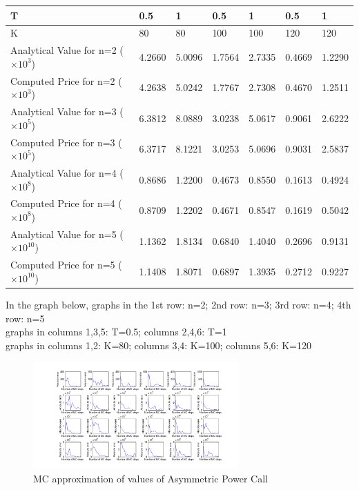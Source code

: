 \documentclass[a4paper]{article}
\begin{document}
\begin{enumerate}
\begin{enumerate}
\begin{table}[ht]
	\centering
    \begin{tabular}{|l|l|l|l|l|l|l|}
    \hline
    T                                          & 0.5    & 1      & 0.5    & 1      & 0.5    & 1      \\ \hline
    K                                          & 80     & 80     & 100    & 100    & 120    & 120    \\ \hline
    Analytical Value for n=2 ($\times10^3$)    & 4.2660 & 5.0096 & 1.7564 & 2.7335 & 0.4669 & 1.2290 \\ \hline
    Computed Price for n=2 ($\times10^3$)      & 4.2638 & 5.0242 & 1.7767 & 2.7308 & 0.4670 & 1.2511 \\ \hline
    Analytical Value for n=3 ($\times10^5$)    & 6.3812 & 8.0889 & 3.0238 & 5.0617 & 0.9061 & 2.6222 \\ \hline
    Computed Price for n=3 ($\times10^5$)      & 6.3717 & 8.1221 & 3.0253 & 5.0696 & 0.9031 & 2.5837 \\ \hline
    Analytical Value for n=4 ($\times10^8$)    & 0.8686 & 1.2200 & 0.4673 & 0.8550 & 0.1613 & 0.4924 \\ \hline
    Computed Price for n=4 ($\times10^8$)      & 0.8709 & 1.2202 & 0.4671 & 0.8547 & 0.1619 & 0.5042 \\ \hline
    Analytical Value for n=5 ($\times10^{10}$) & 1.1362 & 1.8134 & 0.6840 & 1.4040 & 0.2696 & 0.9131 \\ \hline
    Computed Price for n=5 ($\times10^{10}$)   & 1.1408 & 1.8071 & 0.6897 & 1.3935 & 0.2712 & 0.9227 \\ \hline
    \end{tabular}
\end{table}

In the graph below, graphs in the 1st row: n=2; 2nd row: n=3; 3rd row: n=4; 4th row: n=5\\
graphs in columns 1,3,5: T=0.5;  columns 2,4,6: T=1\\
graphs in columns 1,2: K=80; columns 3,4: K=100; columns 5,6: K=120
\begin{figure}[ht]
\centering
\includegraphics[width=0.7\textwidth]{Q4c.png}
\caption{\label{fig:fig03} MC approximation of values of Asymmetric Power Call}
\end{figure}


\end{enumerate}
\end{enumerate}
\end{document}
